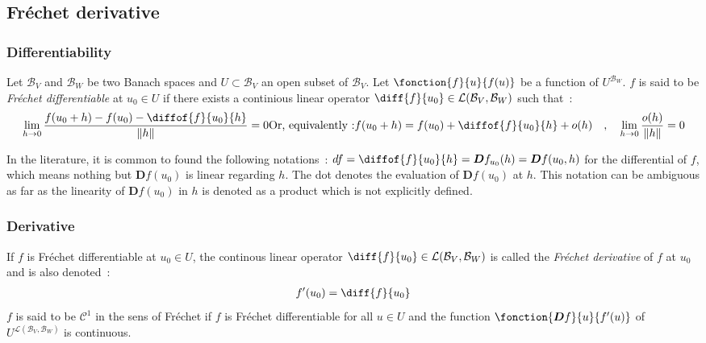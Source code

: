 \subsection{Fréchet derivative}
\subsubsection{Differentiability}
Let $\mathcal{B}_V$ and $\mathcal{B}_W$ be two Banach spaces and $U \subset \mathcal{B}_V$ an open subset of $\mathcal{B}_V$.
Let $\fonction{f}{u}{f(u)}$ be a function of  $U^{\mathcal{B}_W}$.
$f$ is said to be \emph{Fréchet differentiable} at $u_0\in U$ if there exists a continious linear operator $\diff{f}{u_0} \in
\mathcal{L}(\mathcal{B}_V,{\mathcal{B}_W})$ such that~:
\begin{subequations}
\begin{align}
\lim_{h \to 0} \frac{f(u_0+h) - f(u_0)- \diffof{f}{u_0}{h}}{\|h\|} = 0
\end{align}
\text{Or, equivalently~:}
\begin{align}
	f(u_0+h) = f(u_0) + \diffof{f}{u_0}{h} + o(h) \quad , \quad
	\lim_{h \to 0} \frac{o(h)}{\|h\|} = 0
\end{align}
\end{subequations}

In the literature, it is common to found the following notations~: $df = \diffof{f}{u_0}{h} = \boldsymbol{D}f_{u_0}(h) = \boldsymbol{D}f(u_0,h)$ for the differential of $f$, which means nothing but $\boldsymbol{D}f(u_0)$ is linear regarding $h$. The dot denotes the evaluation of $\boldsymbol{D}f(u_0)$ at $h$. This notation can be ambiguous as far as the linearity of $\boldsymbol{D}f(u_0)$ in $h$ is denoted as a product which is not explicitly defined.

\subsubsection{Derivative}

If $f$ is Fréchet differentiable at $u_0 \in U$, the continous linear operator $\diff{f}{u_0} \in
\mathcal{L}(\mathcal{B}_V,{\mathcal{B}_W})$ is called the \emph{Fréchet derivative} of $f$ at $u_0$ and is also denoted~:
\begin{align}
	f'(u_0) = \diff{f}{u_0}
\end{align}
$f$ is said to be $\mathcal{C}^1$ in the sens of Fréchet if $f$ is Fréchet differentiable for all $u \in U$ and the function $\fonction{\boldsymbol{D}f}{u}{f'(u)}$ of $U^{\mathcal{L}(\mathcal{B}_V,{\mathcal{B}_W})}$ is continuous.

